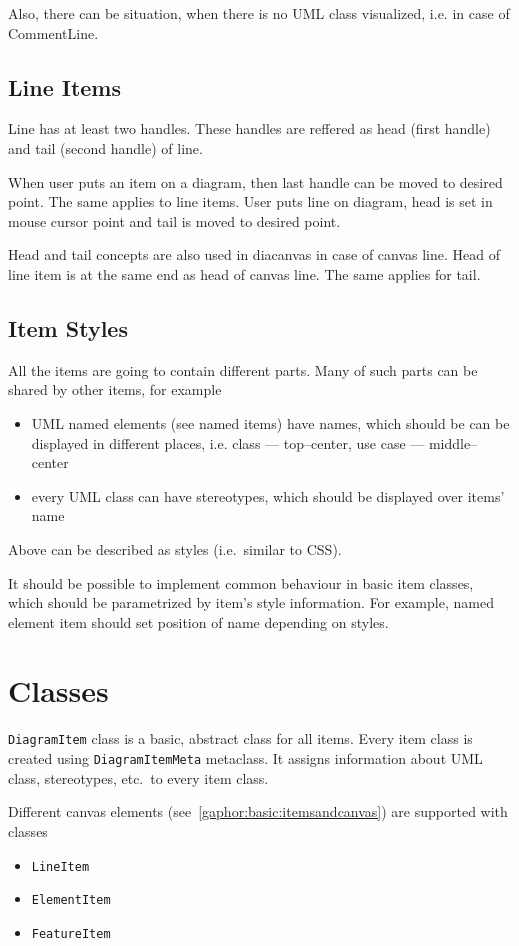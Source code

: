 \documentclass[draft]{book}
\newcommand{\rclass}[1]{\texttt{#1}}
\begin{document}
Also, there can be situation, when there is no UML class visualized, i.e.
in case of CommentLine.

\subsection{Line Items}
Line has at least two handles. These handles are reffered as head (first
handle) and tail (second handle) of line.

When user puts an item on a diagram, then last handle can be moved to
desired point. The same applies to line items. User puts line on diagram,
head is set in mouse cursor point and tail is moved to desired point.

Head and tail concepts are also used in diacanvas in case of canvas line.
Head of line item is at the same end as head of canvas line. The same
applies for tail.

\subsection{Item Styles}
All the items are going to contain different parts.
Many of such parts can be shared by other items, for example
\begin{itemize}
\item UML named elements (see named items) have names, which should be
    can be displayed in different places, i.e. class --- top--center,
    use case --- middle--center
\item every UML class can have stereotypes, which should be displayed
    over items' name
\end{itemize}

Above can be described as styles (i.e.\ similar to CSS).

It should be possible to implement common behaviour in basic item classes,
which should be parametrized by item's style information. For example,
named element item should set position of name depending on styles.

\section{Classes}
\rclass{DiagramItem} class is a basic, abstract class for all items. Every
item class is created using \rclass{DiagramItemMeta} metaclass. It
assigns information about UML class, stereotypes,
etc.\ to every item class.

Different canvas elements (see~\ref{gaphor:basic:itemsandcanvas}) are
supported with classes
\begin{itemize}
\itemsep0pt
\item \rclass{LineItem}
\item \rclass{ElementItem}
\item \rclass{FeatureItem}
\end{itemize}
\end{document}
